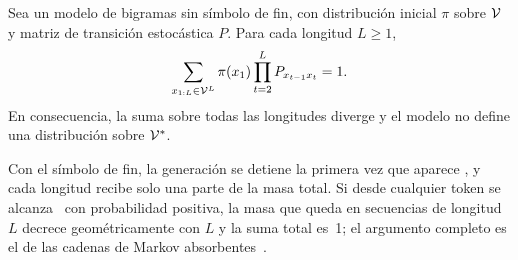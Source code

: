 \begin{proposicion}\label{prop:longitud-fija}
Sea un modelo de bigramas sin símbolo de fin, con distribución inicial $\pi$ sobre $\mathcal{V}$ y matriz de transición estocástica $P$. Para cada longitud $L\ge 1$,
\[
\sum_{x_{1:L}\in\mathcal{V}^{L}}\pi(x_1)\prod_{t=2}^{L}P_{x_{t-1}x_t}=1.
\]
En consecuencia, la suma sobre todas las longitudes diverge y el modelo no define una distribución sobre $\mathcal{V}^{*}$.
\end{proposicion}

\begin{observacion}
Con el símbolo de fin, la generación se detiene la primera vez que aparece \fin, y cada longitud recibe solo una parte de la masa total. Si desde cualquier token se alcanza \fin\ con probabilidad positiva, la masa que queda en secuencias de longitud $L$ decrece geométricamente con $L$ y la suma total es~1; el argumento completo es el de las cadenas de Markov absorbentes~\cite[cap.~7]{bt}.
\end{observacion}

